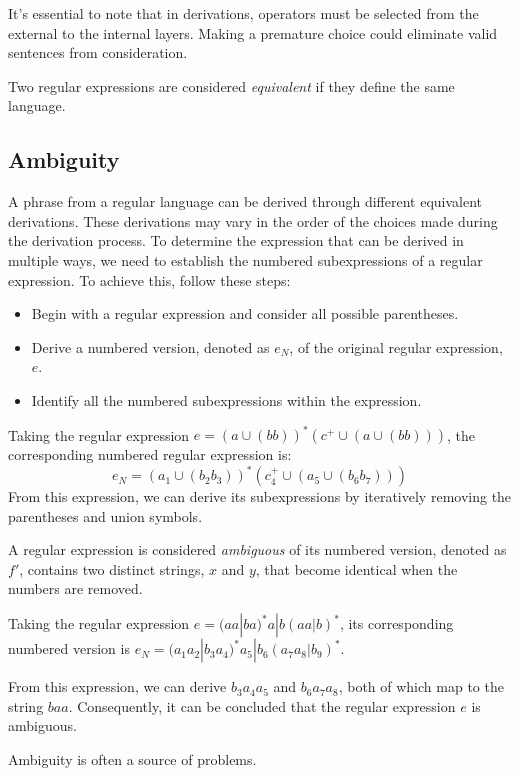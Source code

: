 It's essential to note that in derivations, operators must be selected from the external to the internal layers.
Making a premature choice could eliminate valid sentences from consideration.
\begin{definition}
    Two regular expressions are considered \emph{equivalent} if they define the same language. 
\end{definition}

\subsection*{Ambiguity}
A phrase from a regular language can be derived through different equivalent derivations. 
These derivations may vary in the order of the choices made during the derivation process.
To determine the expression that can be derived in multiple ways, we need to establish the numbered subexpressions of a regular expression. 
To achieve this, follow these steps:
\begin{itemize}
    \item Begin with a regular expression and consider all possible parentheses.
    \item Derive a numbered version, denoted as $e_N$, of the original regular expression, $e$.
    \item Identify all the numbered subexpressions within the expression.
\end{itemize}
\begin{example}
    Taking the regular expression $e=(a \cup(bb))^{*}(c^{+} \cup(a\cup(bb)))$, the corresponding numbered regular expression is:
    \[e_N=(a_1\cup(b_2b_3))^{*}(c_4^{+} \cup(a_5\cup(b_6b_7)))\]
    From this expression, we can derive its subexpressions by iteratively removing the parentheses and union symbols.
\end{example}
\newpage
\begin{definition}
    A regular expression is considered \emph{ambiguous} of its numbered version, denoted as $f'$, contains two distinct strings, $x$ and $y$, that become identical when the numbers are removed.
\end{definition}
\begin{example}
    Taking the regular expression $e=(aa|ba)^{*}a|b(aa|b)^{*}$, its corresponding numbered version is $e_N=(a_1a_2|b_3a_4)^{*}a_5|b_6(a_7a_8|b_9)^{*}$.
    
    From this expression, we can derive $b_3a_4a_5$ and $b_6a_7a_8$, both of which map to the string $baa$. 
    Consequently, it can be concluded that the regular expression $e$ is ambiguous.
\end{example}
Ambiguity is often a source of problems. 

